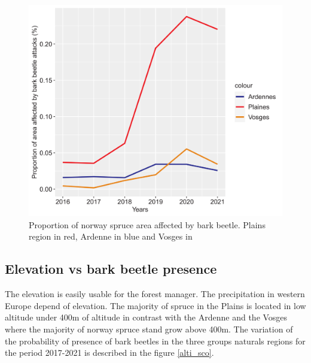 \documentclass[3p,procedia]{elsarticle}
\begin{document}
\begin{figure}
   \centering
   \includegraphics[width=0.6 \textwidth]{Annual_evol_Ardennes_vosges_plaines.png}
    \caption{Proportion of norway spruce area affected by bark beetle. Plains region in red, Ardenne in blue and Vosges in }
    \label{evol_gen}
\end{figure}

    


\subsection{ Elevation vs bark beetle presence}
The elevation is easily usable for the forest manager.
The precipitation in western Europe depend of elevation. 
The majority of spruce in the Plains is located in low altitude under 400m of altitude in contrast with the Ardenne and the Vosges where the majority of norway spruce stand grow above 400m. 
The variation of the probability of presence of bark beetles in the three groups naturals regions for the period 2017-2021 is described in the figure \ref{alti_sco}.
\end{document}
